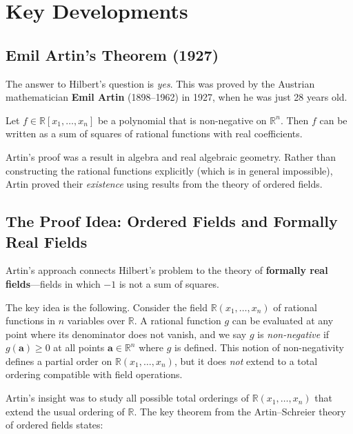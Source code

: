 \section{Key Developments}

\subsection{Emil Artin's Theorem (1927)}

The answer to Hilbert's question is \emph{yes}. This was proved by the Austrian mathematician \textbf{Emil Artin} (1898--1962) in 1927, when he was just 28 years old.

\begin{theorem}[Artin, 1927]
\label{thm:artin}
Let $f \in \mathbb{R}[x_1, \ldots, x_n]$ be a polynomial that is non-negative on $\mathbb{R}^n$. Then $f$ can be written as a sum of squares of rational functions with real coefficients.
\end{theorem}

Artin's proof was a result in algebra and real algebraic geometry. Rather than constructing the rational functions explicitly (which is in general impossible), Artin proved their \emph{existence} using results from the theory of ordered fields.

\subsection{The Proof Idea: Ordered Fields and Formally Real Fields}

Artin's approach connects Hilbert's problem to the theory of \textbf{formally real fields}---fields in which $-1$ is not a sum of squares.

The key idea is the following. Consider the field $\mathbb{R}(x_1, \ldots, x_n)$ of rational functions in $n$ variables over $\mathbb{R}$. A rational function $g$ can be evaluated at any point where its denominator does not vanish, and we say $g$ is \emph{non-negative} if $g(\mathbf{a}) \geq 0$ at all points $\mathbf{a} \in \mathbb{R}^n$ where $g$ is defined. This notion of non-negativity defines a partial order on $\mathbb{R}(x_1,\ldots,x_n)$, but it does \emph{not} extend to a total ordering compatible with field operations.

Artin's insight was to study all possible total orderings of $\mathbb{R}(x_1,\ldots,x_n)$ that extend the usual ordering of $\mathbb{R}$. The key theorem from the Artin--Schreier theory of ordered fields states:

